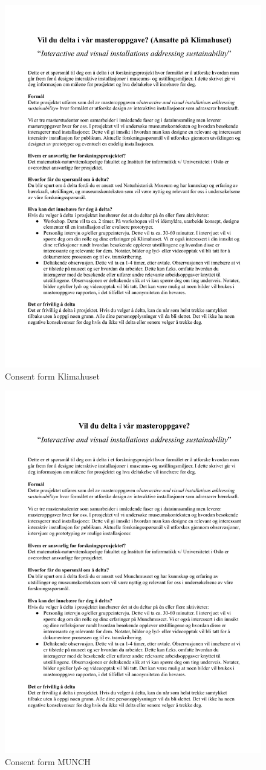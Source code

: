 \begin{figure}[H]
    \centering 
    \includegraphics[width=12.5cm]{pictures/appendix/Samtykkeskjema_klimahuset.pdf}
    \caption{Consent form Klimahuset}
\end{figure}

\begin{figure}[H]
    \centering 
    \includegraphics[width=12.5cm]{pictures/appendix/Samtykkeskjema Munch.docx.pdf}
    \caption{Consent form MUNCH}
\end{figure}
